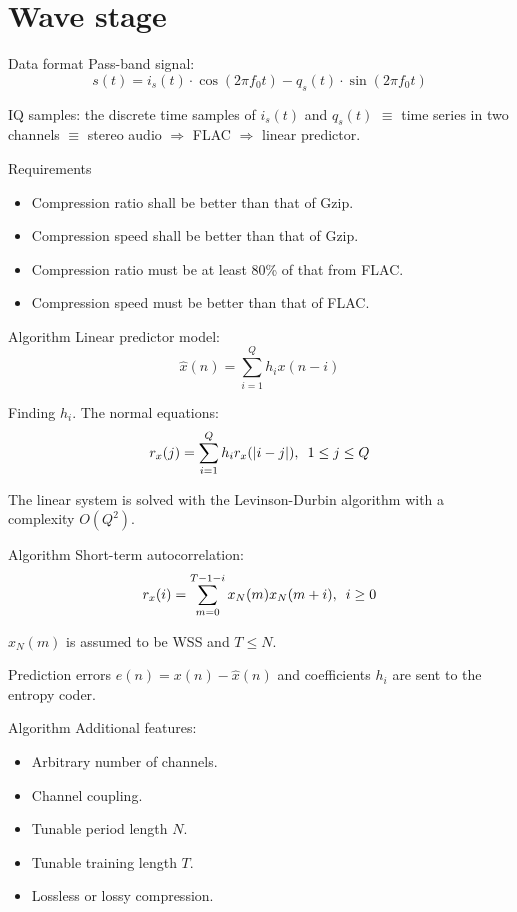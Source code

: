 \documentclass[usenames,dvipsnames]{beamer}
\begin{document}
\section{Wave stage}
\begin{frame}{Data format}
Pass-band signal:
\[
s(t) = i_s(t) \cdot \cos(2\pi f_0 t) - q_s(t) \cdot \sin(2\pi f_0 t)
\]

IQ samples: the discrete time samples of $i_s(t)$ and $q_s(t)$ $\equiv$ time series in two channels $\equiv$ stereo audio $\Rightarrow$ FLAC $\Rightarrow$ linear predictor.
\end{frame}

\begin{frame}{Requirements}
\begin{itemize}
	\item<1-> Compression ratio shall be better than that of Gzip.
	\item<1-> Compression speed shall be better than that of Gzip.
	\item<2-> Compression ratio must be at least 80\% of that from FLAC.
	\item<2-> Compression speed must be better than that of FLAC.
\end{itemize}
\end{frame}

\begin{frame}{Algorithm}
Linear predictor model:
\[
\hat{x}(n) = \sum_{i=1}^{Q} h_i x(n-i)
\]

Finding $h_i$. The normal equations:
\[
r_x(j) = \sum_{i=1}^{Q} h_i r_x(|i-j|) ,\hspace{0.5em} 1 \leq j \leq Q
\]

The linear system is solved with the Levinson-Durbin algorithm with a complexity $O(Q^2)$.

\end{frame}

\begin{frame}{Algorithm}
Short-term autocorrelation:
\[
r_x(i) = \sum_{m=0}^{T-1-i} x_N(m) x_N(m+i) ,\hspace{0.5em} i \geq 0
\]

$x_N(m)$ is assumed to be WSS and $T \leq N$.
\vspace{1em}

Prediction errors $e(n) = x(n) - \hat{x}(n)$ and coefficients $h_i$ are sent to the entropy coder.
\end{frame}

\begin{frame}{Algorithm}
Additional features:
\begin{itemize}
	\item<1-> Arbitrary number of channels.
	\item<1-> Channel coupling.
	\item<2-> Tunable period length $N$.
	\item<2-> Tunable training length $T$.
	\item<3-> Lossless or lossy compression.
\end{itemize}
\end{frame}
\end{document}
